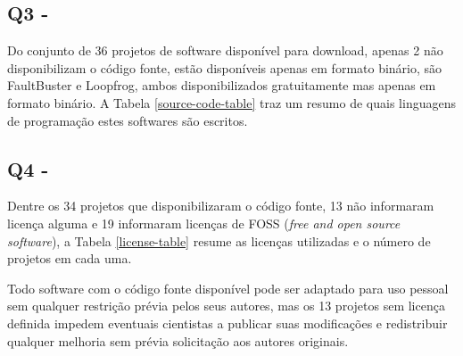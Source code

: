 


\subsection{Q3 - \EstudoUmQuestaoTres} %

Do conjunto de 36 projetos de software disponível para download, apenas 2 não
disponibilizam o código fonte, estão disponíveis apenas em formato binário, são
FaultBuster e Loopfrog, ambos disponibilizados gratuitamente mas apenas em
formato binário. A Tabela \ref{source-code-table} traz um resumo de quais
linguagens de programação estes softwares são escritos.




\subsection{Q4 - \EstudoUmQuestaoQuatro} %

Dentre os 34 projetos que disponibilizaram o código fonte, 13 não informaram
licença alguma e 19 informaram licenças de FOSS ({\it free and open source
software}), a Tabela \ref{license-table} resume as licenças utilizadas e o
número de projetos em cada uma.



Todo software com o código fonte disponível pode ser adaptado para uso pessoal
sem qualquer restrição prévia pelos seus autores, mas os 13 projetos sem
licença definida impedem eventuais cientistas a publicar suas modificações e
redistribuir qualquer melhoria sem prévia solicitação aos autores originais.

